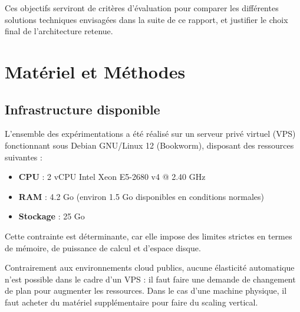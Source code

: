 \documentclass{rapportClass} %
\begin{document}
Ces objectifs serviront de critères d'évaluation pour comparer les
différentes solutions techniques envisagées dans la suite de ce
rapport, et justifier le choix final de l'architecture retenue.


\chapter{Matériel et Méthodes}

\section{Infrastructure disponible}

L'ensemble des expérimentations a été réalisé sur un serveur privé
virtuel (VPS) fonctionnant sous Debian GNU/Linux 12 (Bookworm), 
disposant des ressources suivantes :

\begin{itemize}
    \item \textbf{CPU} : 2 vCPU Intel Xeon E5-2680 v4 @ 2.40 GHz
    \item \textbf{RAM} : 4.2 Go (environ 1.5 Go disponibles en conditions normales)
    \item \textbf{Stockage} : 25 Go 
\end{itemize}

\vspace{0.5cm}

Cette contrainte est déterminante, car elle impose des limites strictes
en termes de mémoire, de puissance de calcul et d'espace disque. 

\smallskip
Contrairement aux environnements cloud publics, aucune élasticité automatique n'est
possible dans le cadre d'un VPS : il faut faire une demande de changement 
de plan pour augmenter les ressources. Dans le cas d'une machine physique, 
il faut acheter du matériel supplémentaire pour faire du scaling vertical.

\end{document}

